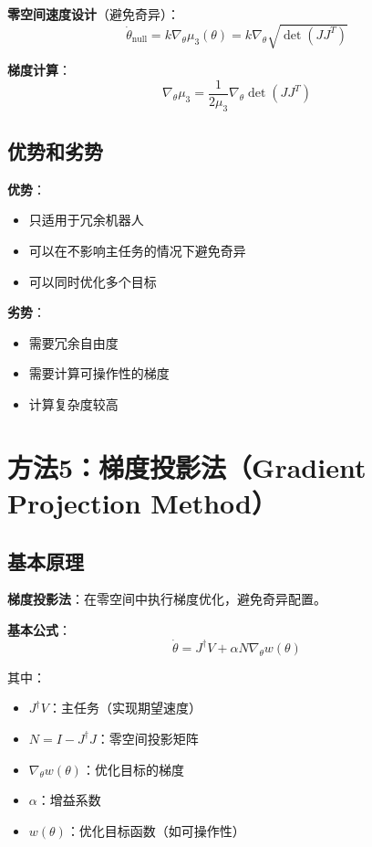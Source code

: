 \documentclass[12pt,a4paper]{article}
\begin{document}
\textbf{零空间速度设计}（避免奇异）：
\begin{equation}
\dot{\theta}_{\text{null}} = k \nabla_{\theta} \mu_3(\theta) = k \nabla_{\theta} \sqrt{\det(JJ^T)}
\end{equation}

\textbf{梯度计算}：
\begin{equation}
\nabla_{\theta} \mu_3 = \frac{1}{2\mu_3} \nabla_{\theta} \det(JJ^T)
\end{equation}

\subsection{优势和劣势}

\textbf{优势}：
\begin{itemize}
\item 只适用于冗余机器人
\item 可以在不影响主任务的情况下避免奇异
\item 可以同时优化多个目标
\end{itemize}

\textbf{劣势}：
\begin{itemize}
\item 需要冗余自由度
\item 需要计算可操作性的梯度
\item 计算复杂度较高
\end{itemize}

\section{方法5：梯度投影法（Gradient Projection Method）}

\subsection{基本原理}

\textbf{梯度投影法}：在零空间中执行梯度优化，避免奇异配置。

\textbf{基本公式}：
\begin{equation}
\dot{\theta} = J^{\dagger}V + \alpha N \nabla_{\theta} w(\theta)
\end{equation}

其中：
\begin{itemize}
\item $J^{\dagger}V$：主任务（实现期望速度）
\item $N = I - J^{\dagger}J$：零空间投影矩阵
\item $\nabla_{\theta} w(\theta)$：优化目标的梯度
\item $\alpha$：增益系数
\item $w(\theta)$：优化目标函数（如可操作性）
\end{itemize}
\end{document}
